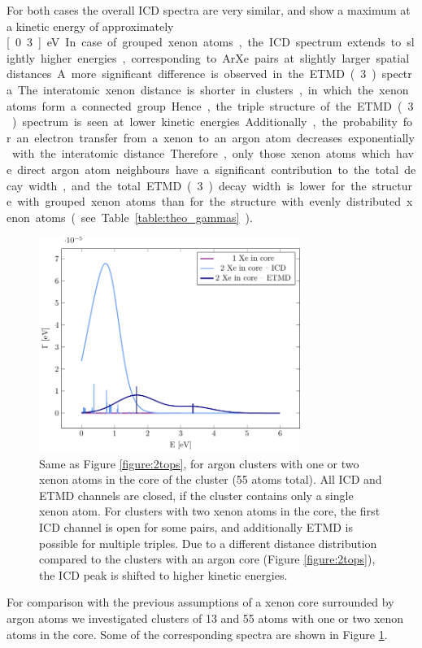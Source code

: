 For both cases the overall ICD spectra are very similar, and show a maximum at a kinetic energy of approximately \unit[0.3]{eV}. 
In case of grouped xenon atoms, the ICD spectrum extends to slightly higher energies, corresponding to ArXe pairs at slightly larger spatial distances.
A more significant difference is observed in the ETMD(3) spectra. 
The interatomic xenon distance is shorter in clusters, in which the xenon atoms form a connected group.
Hence, the triple structure of the ETMD(3) spectrum is seen at lower kinetic energies. 
Additionally, the probability for an electron
transfer from a xenon to an argon atom decreases exponentially with the
interatomic distance. Therefore, only those xenon atoms which have direct
argon atom neighbours have a significant contribution to the
total decay width, and the total ETMD(3) decay width is lower for the structure with
grouped xenon atoms than for
the structure with evenly distributed xenon atoms (see Table \ref{table:theo_gammas}).

\begin{figure}[ht]
 \centering
 \includegraphics[width=8.5cm]{pics/xe_3_in.pdf}
 \caption{Same as Figure \protect\ref{figure:2tops}, for argon clusters with
          one or two xenon atoms in the core of the cluster (55 atoms total). 
          All ICD and ETMD channels are closed, if the cluster contains only 
          a single xenon atom. For clusters with two xenon atoms
          in the core, the first ICD channel is open for some pairs,
          and additionally ETMD is possible for multiple triples. Due to a
          different distance distribution compared to the clusters with an argon
          core (Figure \protect\ref{figure:2tops}), 
          the ICD peak is shifted to higher kinetic energies.}
 \label{figure:xe_3_in}
\end{figure}
%
For comparison with the previous assumptions of a xenon core surrounded
by argon atoms we investigated clusters of 13 and 55 atoms with one or two
xenon atoms in the core. Some of the corresponding
spectra are shown in Figure \ref{figure:xe_3_in}.

